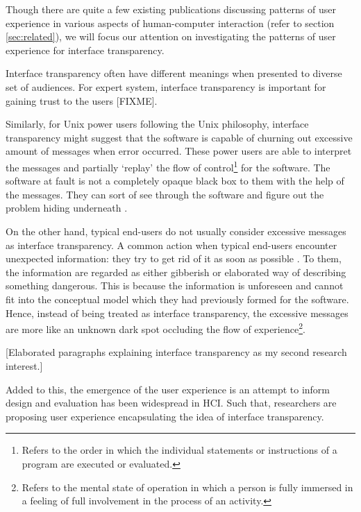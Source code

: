 \documentclass{acm_proc_article-sp}
\begin{document}

Though there are quite a few existing publications discussing patterns
of user experience in various aspects of human-computer interaction
(refer to section \ref{sec:related}), we will focus our attention on
investigating the patterns of user experience for interface
transparency.

Interface transparency often have different meanings when presented to
diverse set of audiences. For expert system, interface transparency is
important for gaining trust to the users [FIXME].

Similarly, for Unix power users following the Unix philosophy,
interface transparency might suggest that the software is capable of
churning out excessive amount of messages when error occurred. These
power users are able to interpret the messages and partially `replay'
the flow of control\footnote{Refers to the order in which the
  individual statements or instructions of a program are executed or
  evaluated.}  for the software. The software at fault is not a
completely opaque black box to them with the help of the
messages. They can sort of see through the software and figure out the
problem hiding underneath \citep{unix:raymond}.

On the other hand, typical end-users do not usually consider excessive
messages as interface transparency. A common action when typical
end-users encounter unexpected information: they try to get rid of it
as soon as possible \citep{oldnew:chen}. To them, the information are
regarded as either gibberish or elaborated way of describing something
dangerous. This is because the information is unforeseen and cannot
fit into the conceptual model which they had previously formed for the
software. Hence, instead of being treated as interface transparency,
the excessive messages are more like an unknown dark spot occluding
the flow of experience\footnote{Refers to the mental state of
  operation in which a person is fully immersed in a feeling of full
  involvement in the process of an activity.}.


[Elaborated paragraphs explaining interface transparency as my second
  research interest.]

Added to this, the emergence of the user experience is an attempt to
inform design and evaluation has been widespread in HCI. Such that,
researchers are proposing user experience encapsulating the idea of
interface transparency.
\end{document}
